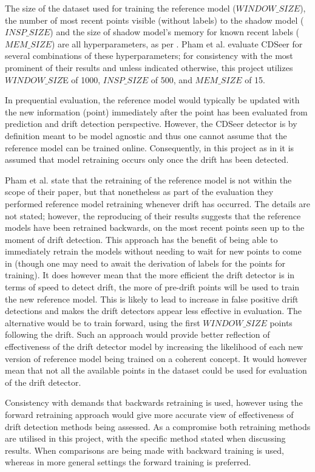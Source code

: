 \documentclass{svproc}
\begin{document}
The size of the dataset used for training the reference model ($WINDOW\_SIZE$), the number of most recent points visible (without labels) to the shadow model ($INSP\_SIZE$) and the size of shadow model’s memory for known recent labels ($MEM\_SIZE$) are all hyperparameters, as per \cite{pham2025}. Pham et al. \cite{pham2025} evaluate CDSeer for several combinations of these hyperparameters; for consistency with the most prominent of their results and unless indicated otherwise, this project utilizes $WINDOW\_SIZ$E of 1000, $INSP\_SIZE$ of 500, and $MEM\_SIZE$ of 15.

In prequential evaluation, the reference model would typically be updated with the new information (point) immediately after the point has been evaluated from prediction and drift detection perspective. However, the CDSeer detector is by definition meant to be model agnostic and thus one cannot assume that the reference model can be trained online. Consequently, in this project as in \cite{pham2025} it is assumed that model retraining occurs only once the drift has been detected.

Pham et al. \cite{pham2025} state that the retraining of the reference model is not within the scope of their paper, but that nonetheless as part of the evaluation they performed reference model retraining whenever drift has occurred. The details are not stated; however, the reproducing of their results suggests that the reference models have been retrained backwards, on the most recent points seen up to the moment of drift detection. This approach has the benefit of being able to immediately retrain the models without needing to wait for new points to come in (though one may need to await the derivation of labels for the points for training). It does however mean that the more efficient the drift detector is in terms of speed to detect drift, the more of pre-drift points will be used to train the new reference model. This is likely to lead to increase in false positive drift detections and makes the drift detectors appear less effective in evaluation. The alternative would be to train forward, using the first $WINDOW\_SIZE$ points following the drift. Such an approach would provide better reflection of effectiveness of the drift detector model by increasing the likelihood of each new version of reference model being trained on a coherent concept. It would however mean that not all the available points in the dataset could be used for evaluation of the drift detector.

Consistency with \cite{pham2025} demands that backwards retraining is used, however using the forward retraining approach would give more accurate view of effectiveness of drift detection methods being assessed. As a compromise both retraining methods are utilised in this project, with the specific method stated when discussing results. When comparisons are being made with \cite{pham2025} backward training is used, whereas in more general settings the forward training is preferred.
\end{document}

